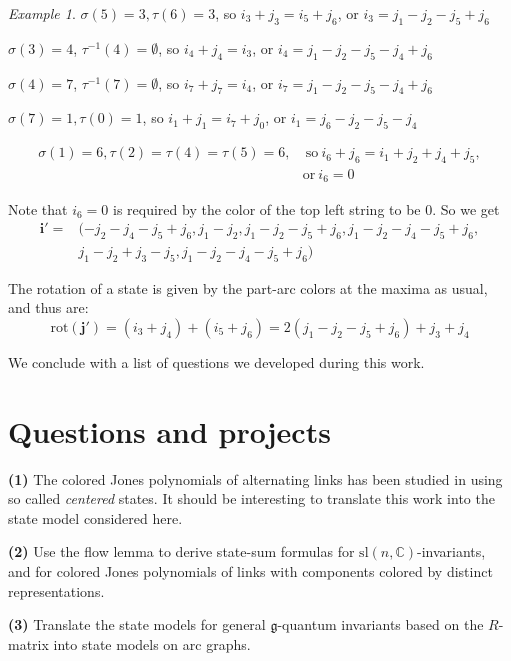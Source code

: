 \documentclass[11pt]{article}
\theoremstyle{definition}
\theoremstyle{remark}
\theoremstyle{remark}
\newtheorem*{exmp}{Example}
\begin{document}
\begin{exmp}
$\sigma (5)=3, \tau (6)=3$, so $i_3+j_3=i_5+j_6$, or $i_3=j_1-j_2-j_5+j_6$

$\sigma (3)=4$, $\tau^{-1}(4)=\emptyset $, so $i_4+j_4=i_3$, or $i_4=j_1-j_2-j_5-j_4+j_6$

$\sigma (4)=7$, $\tau^{-1}(7)=\emptyset $, so $i_7+j_7=i_4$, or $i_7=j_1-j_2-j_5-j_4+j_6$

$\sigma (7)=1, \tau (0)=1$, so $i_1+j_1=i_7+j_0$, or $i_1=j_6-j_2-j_5-j_4$

\vskip -0.3in

\begin{align*}
\sigma (1)=6, \tau (2)=\tau (4)=\tau (5)=6, & \ \textrm{so} \ i_6+j_6=i_1+j_2+j_4+j_5, \\
& \textrm{or} \ i_6=0
\end{align*}

Note that $i_6=0$ is required by the color of the top left string to be $0$. So we get 
\begin{align*}
\mathbf{i}'=&(-j_2-j_4-j_5+j_6,j_1-j_2,j_1-j_2-j_5+j_6,j_1-j_2-j_4-j_5+j_6,\\
\ & j_1-j_2+j_3-j_5,j_1-j_2-j_4-j_5+j_6)
\end{align*}

The rotation of a state is given by the part-arc colors at the maxima as usual, and thus are:
$$\textrm{rot}(\mathbf{j}')=(i_3+j_4)+(i_5+j_6)=2(j_1-j_2-j_5+j_6)+j_3+j_4$$


\end{exmp}

\vskip 0.2in

We conclude with a list of questions we developed during this work. 

\vskip 0.1in

\section{Questions and projects}

\noindent \textbf{(1)} The colored Jones polynomials of alternating links has been studied in \cite{G1} using so called \textit{centered} states. It should be interesting to translate this work into the state model considered here.  

\noindent \textbf{(2)} Use the flow lemma to derive state-sum formulas for $\textrm{sl}(n,\mathbb{C})$-invariants, and for colored Jones polynomials of links with components colored by distinct representations. 

\noindent \textbf{(3)} Translate the state models for general $\mathfrak{g}$-quantum invariants based on the $R$-matrix into state models on arc graphs.
\end{document}
